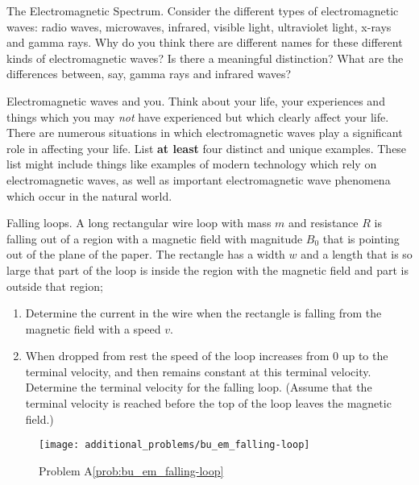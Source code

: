 \begin{aproblem}{The Electromagnetic Spectrum.}  
  Consider the different types of electromagnetic waves: radio waves,
  microwaves, infrared, visible light, ultraviolet light, x-rays and
  gamma rays.  Why do you think there are different names for these
  different kinds of electromagnetic waves?  Is there a meaningful
  distinction?  What are the differences between, say, gamma rays and
  infrared waves?
\end{aproblem}


\begin{aproblem}{Electromagnetic waves and you}.  
  Think about your life, your experiences and things which you may
  {\it not} have experienced but which clearly affect your life. There
  are numerous situations in which electromagnetic waves play a
  significant role in affecting your life.  List {\bf at least} four
  distinct and unique examples.  These list might include things like
  examples of modern technology which rely on electromagnetic waves,
  as well as important electromagnetic wave phenomena which occur in
  the natural world.
\end{aproblem}


\begin{aproblem}{Falling loops.}  
  A long rectangular wire loop with mass $m$ and resistance $R$ is
  falling out of a region with a magnetic field with magnitude $B_0$
  that is pointing out of the plane of the paper.  The rectangle has a
  width $w$ and a length that is so large that part of the loop is
  inside the region with the magnetic field and part is outside that
  region;
  \begin{enumerate}
  \item Determine the current in the wire when the rectangle is
    falling from the magnetic field with a speed $v$.
  \item When dropped from rest the speed of the loop increases from
    $0$ up to the terminal velocity, and then remains constant at this
    terminal velocity.  Determine the terminal velocity for the
    falling loop.  (Assume that the terminal velocity is reached
    before the top of the loop leaves the magnetic field.)
  \end{enumerate}

  \begin{figure}[h]
    \begin{center}
      \texttt{[image: additional\_problems/bu\_em\_falling-loop]}
      \caption{Problem A\ref{prob:bu_em_falling-loop}}
    \end{center}
  \end{figure}
  \label{prob:bu_em_falling-loop}
\end{aproblem}


